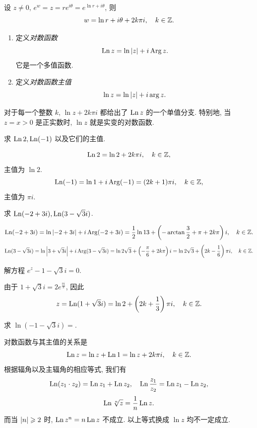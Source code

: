 设 $z\neq 0$, $e^w=z=re^{i\theta}=e^{\ln r+i\theta}$,
则
\[w=\ln r+i\theta+2k\pi i,\quad k\in{\mathbb{Z}}.\]
\begin{definition}[对数函数]
	\begin{enumerate}
		\item 定义\emph{对数函数}
			\[\operatorname{Ln} z=\ln\left|z\right|+i\operatorname{Arg} z.\]
			它是一个多值函数.
		\item 定义\emph{对数函数主值}
			\[\ln z=\ln\left|z\right|+i\arg z.\]
	\end{enumerate}
\end{definition}
对于每一个整数 $k$, $\ln z+2k\pi i$ 都给出了 $\operatorname{Ln} z$ 的一个单值分支.
特别地, 当 $z=x>0$ 是正实数时, $\ln z$ 就是实变的对数函数.

\begin{example}
	求 $\operatorname{Ln} 2,\operatorname{Ln}(-1)$ 以及它们的主值.
\end{example}

\begin{solution}
	\[\operatorname{Ln}2=\ln2+2k\pi i,\quad k\in{\mathbb{Z}},\]
	主值为 $\ln 2$.
	\[\operatorname{Ln}(-1)=\ln1+i\operatorname{Arg}(-1)=(2k+1)\pi i,\quad k\in{\mathbb{Z}},\]
	主值为 $\pi i$.
\end{solution}

\begin{example}
求 $\operatorname{Ln}(-2+3i),\operatorname{Ln}(3-\sqrt3 i)$.
\end{example}

\begin{solution}
	\[
    \operatorname{Ln}(-2+3i)=\ln\left|-2+3i\right|+i\operatorname{Arg}(-2+3i)
      =\frac 12\ln 13+\left(-\arctan\frac 32+\pi+2k\pi\right)i,
      \quad k\in{\mathbb{Z}}.
  \]
	\[
    \operatorname{Ln}(3-\sqrt3i)=\ln\left|3+\sqrt 3i\right|+i\operatorname{Arg}(3-\sqrt 3i)
      =\ln 2\sqrt 3+\left(-\frac\pi6+2k\pi\right)i
      =\ln 2\sqrt 3+\left(2k-\frac16\right)\pi i,
      \quad k\in{\mathbb{Z}}.
  \]
\end{solution}

\begin{example}
	解方程 $e^z-1-\sqrt 3i=0$.
\end{example}

\begin{solution}
	由于 $1+\sqrt 3 i=2e^{\frac{\pi i}3}$, 因此
	\[z=\operatorname{Ln}(1+\sqrt 3i)=\ln 2+\left(2k+\frac13\right)\pi i,\quad k\in{\mathbb{Z}}.\]
\end{solution}

\begin{exercise}
	求 $\ln(-1-\sqrt3 i)=$\fillblank[2cm][3mm]{}.
\end{exercise}

对数函数与其主值的关系是
\[\operatorname{Ln} z=\ln z+\operatorname{Ln} 1=\ln z+2k\pi i,\quad k\in{\mathbb{Z}}.\]
根据辐角以及主辐角的相应等式, 我们有
\[\operatorname{Ln}(z_1\cdot z_2)=\operatorname{Ln} z_1+\operatorname{Ln} z_2,\quad
  \operatorname{Ln}\frac{z_1}{z_2}=\operatorname{Ln} z_1-\operatorname{Ln} z_2,\]
\[\operatorname{Ln} \sqrt[n]z=\dfrac1n\operatorname{Ln} z.\]
而当 $\left|n\right|\geqslant 2$ 时, \alert{$\operatorname{Ln} z^n=n\operatorname{Ln} z$ 不成立}.
以上等式换成 $\ln z$ 均不一定成立.


